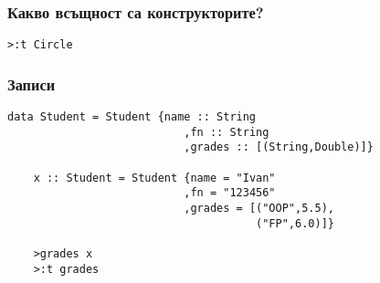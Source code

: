 \documentclass{beamer}
\begin{document}
\begin{frame}[fragile]
  \frametitle{Какво всъщност са конструкторите?}

  \begin{lstlisting}[basicstyle=\small]
    >:t Circle
  \end{lstlisting}

\end{frame}

\begin{frame}[fragile]
  \frametitle{Записи}

  \begin{lstlisting}[basicstyle=\small]
    data Student = Student {name :: String
                           ,fn :: String
                           ,grades :: [(String,Double)]}

    x :: Student = Student {name = "Ivan"
                           ,fn = "123456"
                           ,grades = [("OOP",5.5),
                                      ("FP",6.0)]}                           

    >grades x
    >:t grades
  \end{lstlisting}

\end{frame}


\end{document}
